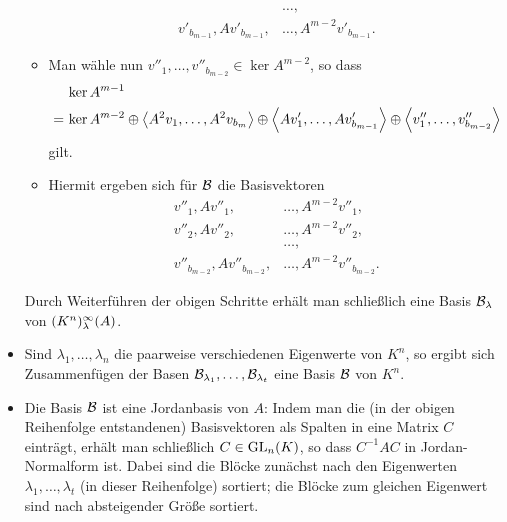 \begin{itemize}[resume]
\begin{itemize}
\begin{align*}
                                        &\dotsc,                        \\
          v'_{b_{m-1}}, A v'_{b_{m-1}}, &\dotsc, A^{m-2} v'_{b_{m-1}}.
        \end{align*}
      \item
        Man wähle nun $v''_1, \dotsc, v''_{b_{m-2}} \in \ker A^{m-2}$, so dass
        \begin{align*}
           &\,      \ker A^{m-1}  \\
          =&\,      \ker A^{m-2}
            \oplus  \left\langle  A^2 v_1, \dotsc, A^2 v_{b_m}  \right\rangle
            \oplus  \left\langle  A v'_1, \dotsc, A v'_{b_{m-1}}  \right\rangle
            \oplus  \left\langle  v''_1, \dotsc, v''_{b_{m-2}}  \right\rangle
        \end{align*}
        gilt.
      \item
        Hiermit ergeben sich für $\mathcal{B}$ die Basisvektoren
        \begin{align*}
          v''_1,         A v''_1,         &\dotsc, A^{m-2} v''_1,         \\
          v''_2,         A v''_2,         &\dotsc, A^{m-2} v''_2,         \\
                                          &\dotsc,                        \\
          v''_{b_{m-2}}, A v''_{b_{m-2}}, &\dotsc, A^{m-2} v''_{b_{m-2}}.
        \end{align*}
    \end{itemize}
    Durch Weiterführen der obigen Schritte erhält man schließlich eine Basis $\mathcal{B}_\lambda$ von $(K^n)_{\lambda}^{\infty}(A)$.
    
  \item
    Sind $\lambda_1, \dotsc, \lambda_n$ die paarweise verschiedenen Eigenwerte von $K^n$, so ergibt sich Zusammenfügen der Basen $\mathcal{B}_{\lambda_1}, \dotsc, \mathcal{B}_{\lambda_t}$ eine Basis $\mathcal{B}$ von $K^n$.
 
  \item
    Die Basis $\mathcal{B}$ ist eine Jordanbasis von $A$:
    Indem man die (in der obigen Reihenfolge entstandenen) Basisvektoren als Spalten in eine Matrix $C$ einträgt, erhält man schließlich $C \in \operatorname{GL}_{n}(K)$, so dass $C^{-1} A C$ in Jordan-Normalform ist.
    Dabei sind die Blöcke zunächst nach den Eigenwerten $\lambda_1, \dotsc, \lambda_t$ (in dieser Reihenfolge) sortiert;
    die Blöcke zum gleichen Eigenwert sind nach absteigender Größe sortiert.
\end{itemize}



